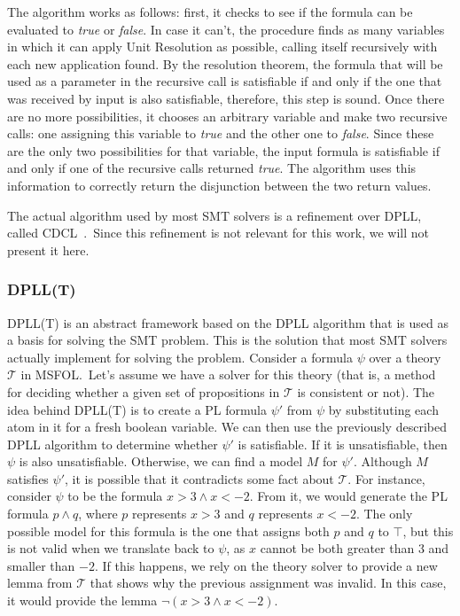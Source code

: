 The algorithm works as follows: first, it checks to see if the formula can be evaluated to \textit{true} or \textit{false}. In case it can't, the procedure finds as many variables in which it can apply Unit Resolution as possible, calling itself recursively with each new application found. By the resolution theorem, the formula that will be used as a parameter in the recursive call is satisfiable if and only if the one that was received by input is also satisfiable, therefore, this step is sound. Once there are no more possibilities, it chooses an arbitrary variable and make two recursive calls: one assigning this variable to \textit{true} and the other one to \textit{false}. Since these are the only two possibilities for that variable, the input formula is satisfiable if and only if one of the recursive calls returned \textit{true}. The algorithm uses this information to correctly return the disjunction between the two return values.

The actual algorithm used by most SMT solvers is a refinement over DPLL, called CDCL~\cite{cdcl}.\ Since this refinement is not relevant for this work, we will not present it here.

\subsubsection{DPLL(T)}

DPLL(T) is an abstract framework based on the DPLL algorithm that is used as a basis for solving the SMT problem. This is the solution that most SMT solvers actually implement for solving the problem. Consider a formula $\psi$ over a theory $\mathcal{T}$ in MSFOL.\ Let's assume we have a solver for this theory (that is, a method for deciding whether a given set of propositions in $\mathcal{T}$ is consistent or not). The idea behind DPLL(T) is to create a PL formula $\psi'$ from $\psi$ by substituting each atom in it for a fresh boolean variable. We can then use the previously described DPLL algorithm to determine whether $\psi'$ is satisfiable. If it is unsatisfiable, then $\psi$ is also unsatisfiable. Otherwise, we can find a model $M$ for $\psi'$. Although $M$ satisfies $\psi'$, it is possible that it contradicts some fact about $\mathcal{T}$. For instance, consider $\psi$ to be the formula $x > 3 \wedge x < -2$. From it, we would generate the PL formula $p \wedge q$, where $p$ represents $x > 3$ and $q$ represents $x < -2$. The only possible model for this formula is the one that assigns both $p$ and $q$ to $\top$, but this is not valid when we translate back to $\psi$, as $x$ cannot be both greater than $3$ and smaller than $-2$. If this happens, we rely on the theory solver to provide a new lemma from $\mathcal{T}$ that shows why the previous assignment was invalid. In this case, it would provide the lemma $\neg (x > 3 \wedge x < -2)$.


